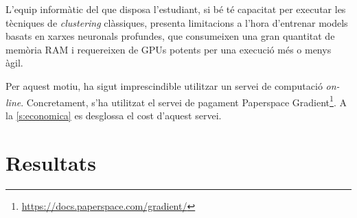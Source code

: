\documentclass[CAT,BIB]{TFUOC}%
\begin{document}
            L'equip informàtic del que disposa l'estudiant,
            si bé té capacitat per executar les tècniques de \textit{clustering} clàssiques,
            presenta limitacions a l'hora d'entrenar models
            basats en xarxes neuronals profundes,
            que consumeixen una gran quantitat de memòria RAM
            i requereixen de GPUs potents per una execució més o menys àgil.

            Per aquest motiu,
            ha sigut imprescindible utilitzar un servei de computació \textit{on-line}.
            Concretament, s'ha utilitzat el servei de pagament Paperspace Gradient\footnote{\url{https://docs.paperspace.com/gradient/}}.
            A la \cref{s:economica} es desglossa el cost d'aquest servei.



\chapter{Resultats}
\label{c:resultats}
\end{document}
